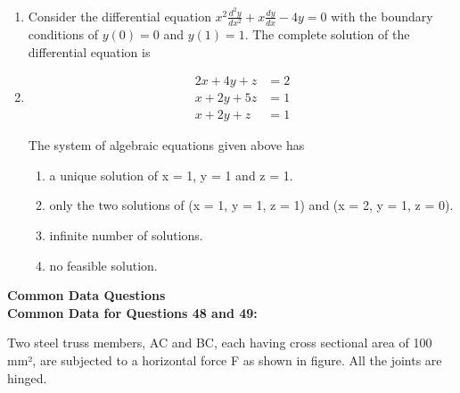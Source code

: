 \documentclass[journal,11pt,onecolumn]{IEEEtran}
\begin{document}
\begin{enumerate}[resume]
    \item Consider the differential equation \(x^2\frac{d^2y}{dx^2} + x\frac{dy}{dx} - 4y = 0\) with the boundary conditions of \(y(0) = 0\) and \(y(1) = 1\). The complete solution of the differential equation is

          \begin{enumerate}
          \end{enumerate}

    \item
          \begin{align}
              2x + 4y + z & = 2 \\
              x + 2y + 5z & = 1 \\
              x + 2y + z  & = 1
          \end{align}

          The system of algebraic equations given above has


          \begin{enumerate}
              \item a unique solution of x = 1, y = 1 and z = 1.
              \item only the two solutions of (x = 1, y = 1, z = 1) and (x = 2, y = 1, z = 0).
              \item infinite number of solutions.
              \item no feasible solution.
          \end{enumerate}

\end{enumerate}

\newpage

\large\textbf{Common Data Questions}\\

\normalsize\textbf{Common Data for Questions 48 and 49:}

Two steel truss members, AC and BC, each having cross sectional area of 100 mm², are subjected to a horizontal force F as shown in figure. All the joints are hinged.
\end{document}

